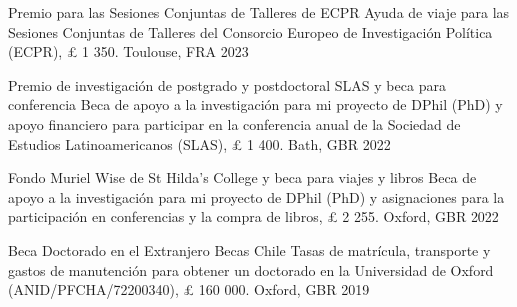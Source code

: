 





\vspace{1mm}

\begin{cvhonors}
\cvhonor
{Premio para las Sesiones Conjuntas de Talleres de ECPR} 
{Ayuda de viaje para las Sesiones Conjuntas de Talleres del Consorcio Europeo de Investigación Política (ECPR), {\pounds} 1 350.}
{Toulouse, FRA}
{2023}
\end{cvhonors}

\vspace{1mm}

\begin{cvhonors}
\cvhonor
{Premio de investigación de postgrado y postdoctoral SLAS y beca para conferencia} 
{Beca de apoyo a la investigación para mi proyecto de DPhil (PhD) y apoyo financiero para participar en la conferencia anual de la Sociedad de Estudios Latinoamericanos (SLAS), {\pounds} 1 400.}
{Bath, GBR}
{2022}
\end{cvhonors}

\vspace{1mm}

\begin{cvhonors}
\cvhonor
{Fondo Muriel Wise de St Hilda's College y beca para viajes y libros} 
{Beca de apoyo a la investigación para mi proyecto de DPhil (PhD) y asignaciones para la participación en conferencias y la compra de libros, {\pounds} 2 255.} 
{Oxford, GBR}
{2022}
\end{cvhonors}

\vspace{1mm}

\begin{cvhonors}
\cvhonor
{Beca Doctorado en el Extranjero Becas Chile} 
{Tasas de matrícula, transporte y gastos de manutención para obtener un doctorado en la Universidad de Oxford (ANID/PFCHA/72200340), {\pounds} 160 000.}
{Oxford, GBR}
{2019}
\end{cvhonors}

